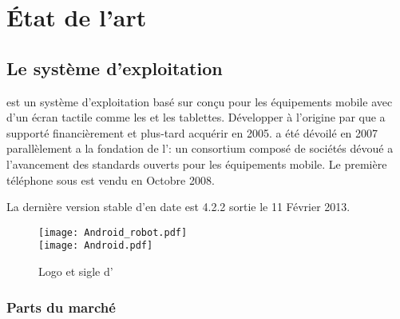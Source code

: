
\chapter{État de l'art}
\section{Le système d'exploitation \android}
\android est un système d'exploitation basé sur  conçu pour les équipements mobile avec d'un écran tactile comme les  et les tablettes. Développer à l'origine par  que  a supporté financièrement et plus-tard acquérir en 2005. \android a été dévoilé en 2007 parallèlement a la fondation de l': un consortium composé de sociétés dévoué a l'avancement des standards ouverts pour les équipements mobile. Le première téléphone sous \android est vendu en Octobre 2008.

La dernière version stable d'\android en date est 4.2.2  sortie le 11 Février 2013.

\begin{figure}
\begin{center}
\texttt{[image: Android\_robot.pdf]}\\
\texttt{[image: Android.pdf]}
\end{center}
\caption{Logo et sigle d'\android}
\end{figure}

\subsection{Parts du marché}

